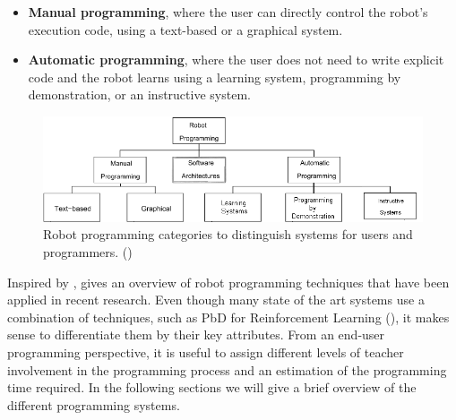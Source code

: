 \begin{itemize}
  \item {\textbf{Manual programming}, where the user can directly control the robot's execution code, using a text-based or a graphical system.}
  \item {\textbf{Automatic programming}, where the user does not need to write explicit code and the robot learns using a learning system, programming by demonstration, or an instructive system.}
\end{itemize}

 \begin{figure}[ht]
 \centering
\includegraphics[width=\linewidth]{figures/Biggs2003-RobotProgramming-short}
 \caption{Robot programming categories to distinguish systems for users and programmers. (\cite{Biggs2003})}
 \label{fig:RobotProgrammingSystems}
\end{figure} 

Inspired by \cite{Biggs2003},  gives an overview of robot programming techniques that have been applied in recent research.
Even though many state of the art systems use a combination of techniques, such as PbD for Reinforcement Learning (\cite{hester2017learning}), it makes sense to differentiate them by their key attributes.
From an end-user programming perspective, it is useful to assign different levels of teacher involvement in the programming process and an estimation of the programming time required.
In the following sections we will give a brief overview of the different programming systems.


